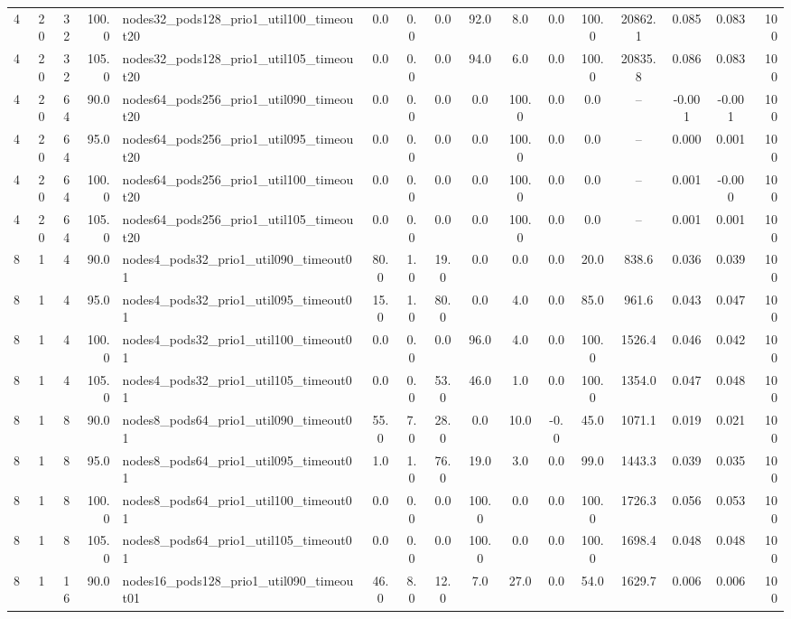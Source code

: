 \begin{tabular}{r r r r l c c c c c c c c c c r}
4 & 20 & 32 & 100.0 & nodes32\_pods128\_prio1\_util100\_timeout20 & 0.0 & 0.0 & 0.0 & 92.0 & 8.0 & 0.0 & 100.0 & 20862.1 & 0.085 & 0.083 & 100 \\
4 & 20 & 32 & 105.0 & nodes32\_pods128\_prio1\_util105\_timeout20 & 0.0 & 0.0 & 0.0 & 94.0 & 6.0 & 0.0 & 100.0 & 20835.8 & 0.086 & 0.083 & 100 \\
4 & 20 & 64 & 90.0 & nodes64\_pods256\_prio1\_util090\_timeout20 & 0.0 & 0.0 & 0.0 & 0.0 & 100.0 & 0.0 & 0.0 & -- & -0.001 & -0.001 & 100 \\
4 & 20 & 64 & 95.0 & nodes64\_pods256\_prio1\_util095\_timeout20 & 0.0 & 0.0 & 0.0 & 0.0 & 100.0 & 0.0 & 0.0 & -- & 0.000 & 0.001 & 100 \\
4 & 20 & 64 & 100.0 & nodes64\_pods256\_prio1\_util100\_timeout20 & 0.0 & 0.0 & 0.0 & 0.0 & 100.0 & 0.0 & 0.0 & -- & 0.001 & -0.000 & 100 \\
4 & 20 & 64 & 105.0 & nodes64\_pods256\_prio1\_util105\_timeout20 & 0.0 & 0.0 & 0.0 & 0.0 & 100.0 & 0.0 & 0.0 & -- & 0.001 & 0.001 & 100 \\
8 & 1 & 4 & 90.0 & nodes4\_pods32\_prio1\_util090\_timeout01 & 80.0 & 1.0 & 19.0 & 0.0 & 0.0 & 0.0 & 20.0 & 838.6 & 0.036 & 0.039 & 100 \\
8 & 1 & 4 & 95.0 & nodes4\_pods32\_prio1\_util095\_timeout01 & 15.0 & 1.0 & 80.0 & 0.0 & 4.0 & 0.0 & 85.0 & 961.6 & 0.043 & 0.047 & 100 \\
8 & 1 & 4 & 100.0 & nodes4\_pods32\_prio1\_util100\_timeout01 & 0.0 & 0.0 & 0.0 & 96.0 & 4.0 & 0.0 & 100.0 & 1526.4 & 0.046 & 0.042 & 100 \\
8 & 1 & 4 & 105.0 & nodes4\_pods32\_prio1\_util105\_timeout01 & 0.0 & 0.0 & 53.0 & 46.0 & 1.0 & 0.0 & 100.0 & 1354.0 & 0.047 & 0.048 & 100 \\
8 & 1 & 8 & 90.0 & nodes8\_pods64\_prio1\_util090\_timeout01 & 55.0 & 7.0 & 28.0 & 0.0 & 10.0 & -0.0 & 45.0 & 1071.1 & 0.019 & 0.021 & 100 \\
8 & 1 & 8 & 95.0 & nodes8\_pods64\_prio1\_util095\_timeout01 & 1.0 & 1.0 & 76.0 & 19.0 & 3.0 & 0.0 & 99.0 & 1443.3 & 0.039 & 0.035 & 100 \\
8 & 1 & 8 & 100.0 & nodes8\_pods64\_prio1\_util100\_timeout01 & 0.0 & 0.0 & 0.0 & 100.0 & 0.0 & 0.0 & 100.0 & 1726.3 & 0.056 & 0.053 & 100 \\
8 & 1 & 8 & 105.0 & nodes8\_pods64\_prio1\_util105\_timeout01 & 0.0 & 0.0 & 0.0 & 100.0 & 0.0 & 0.0 & 100.0 & 1698.4 & 0.048 & 0.048 & 100 \\
8 & 1 & 16 & 90.0 & nodes16\_pods128\_prio1\_util090\_timeout01 & 46.0 & 8.0 & 12.0 & 7.0 & 27.0 & 0.0 & 54.0 & 1629.7 & 0.006 & 0.006 & 100 \\

\end{tabular}

